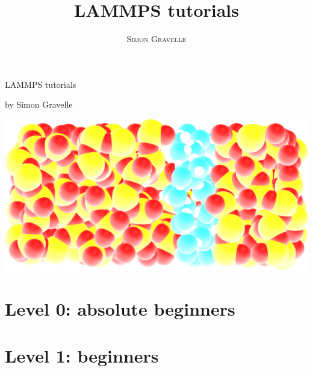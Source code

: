 \documentclass[a4paper,11pt]{book}
\title{\Huge \textbf{LAMMPS tutorials}}
\author{\textsc{Simon Gravelle}}
\date{}
\begin{document}
\begin{titlepage}
\pagecolor{titlepagecolor}
\noindent
\color{white}
\begin{center}
\vspace{1.5cm}
\hspace{0.7cm}\textsf{{\fontsize{50}{60}\selectfont LAMMPS tutorials}}
\par
\vspace{0.5cm}
{\textsf{\fontsize{20}{60}\selectfont by Simon Gravelle}}
\end{center}

\vspace{4cm}
\begin{center}
\noindent \includegraphics[width=16cm]{logo/logo-large-dark.png}
\end{center}
\end{titlepage}
\restoregeometry %
\nopagecolor%

\tableofcontents
\mainmatter

\part{Level 0: absolute beginners}



\part{Level 1: beginners}


\end{document}

